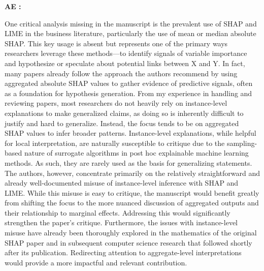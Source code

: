 \documentclass[11pt]{article}
\newcounter{se}[section]
\newcounter{aed}[section]
\newenvironment{aed}[1][]{%
    \refstepcounter{aed}\par\medskip\noindent%
    \textbf{AE \theaed: #1}\rmfamily\itshape%
}{\medskip}
\begin{document}
\begin{aed}
    One critical analysis missing in the manuscript is the prevalent use of SHAP and LIME in the business literature, particularly the use of mean or median absolute SHAP. This key usage is absent but represents one of the primary ways researchers leverage these methods—to identify signals of variable importance and hypothesize or speculate about potential links between X and Y. In fact, many papers already follow the approach the authors recommend by using aggregated absolute SHAP values to gather evidence of predictive signals, often as a foundation for hypothesis generation. From my experience in handling and reviewing papers, most researchers do not heavily rely on instance-level explanations to make generalized claims, as doing so is inherently difficult to justify and hard to generalize. Instead, the focus tends to be on aggregated SHAP values to infer broader patterns. Instance-level explanations, while helpful for local interpretation, are naturally susceptible to critique due to the sampling-based nature of surrogate algorithms in post hoc explainable machine learning methods. As such, they are rarely used as the basis for generalizing statements. The authors, however, concentrate primarily on the relatively straightforward and already well-documented misuse of instance-level inference with SHAP and LIME. While this misuse is easy to critique, the manuscript would benefit greatly from shifting the focus to the more nuanced discussion of aggregated outputs and their relationship to marginal effects.
Addressing this would significantly strengthen the paper’s critique. Furthermore, the issues with instance-level misuse have already been thoroughly explored in the mathematics of the original SHAP paper and in subsequent computer science research that followed shortly after
its publication. Redirecting attention to aggregate-level interpretations would provide a more impactful and relevant contribution.
\end{aed}
\end{document}
